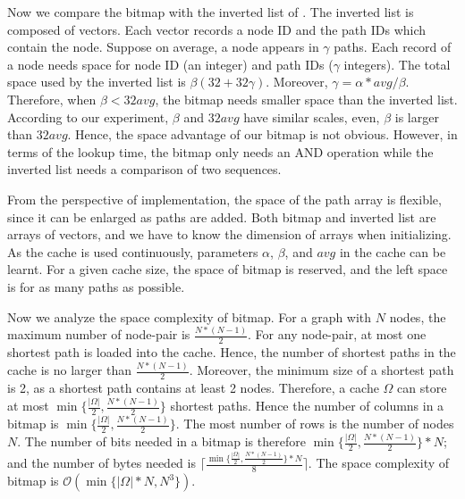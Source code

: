 Now we compare the bitmap with the inverted list of \cite{thomsen2012effective}. The inverted list is composed of vectors. Each vector records a node ID and the path IDs which contain the node.
Suppose on average, a node appears in $\gamma$ paths. Each record of a node needs space for node ID (an integer) and path IDs ($\gamma$ integers). The total space used by the inverted list is $\beta(32+32\gamma)$. Moreover, $\gamma=\alpha*\textit{avg}/\beta$. Therefore, when $\beta<32 \textit{avg}$, the bitmap needs smaller space than the inverted list. According to our experiment, $\beta$ and $32\textit{avg}$ have similar scales, even, $\beta$ is larger than $32\textit{avg}$. Hence, the space advantage of our bitmap is not obvious.
However, in terms of the lookup time, the bitmap only needs an AND operation while the inverted list needs a comparison of two sequences.

From the perspective of implementation, the space of the path array is flexible, since it can be enlarged as paths are added.
Both bitmap and inverted list are arrays of vectors, and we have to know the dimension of arrays when initializing. As the cache is used continuously, parameters $\alpha$, $\beta$, and $\textit{avg}$ in the cache can be learnt. For a given cache size, the space of bitmap is reserved, and the left space is for as many paths as possible.


Now we analyze the space complexity of bitmap. For a graph with $N$ nodes, the maximum number of node-pair is $\frac{N*(N-1)}{2}$.
For any node-pair, at most one shortest path is loaded into the cache. Hence, the number of shortest paths in the cache is no larger than $\frac{N*(N-1)}{2}$. Moreover, the minimum size of a shortest path is 2, as a shortest path contains at least 2 nodes.
Therefore, a cache $\Omega$ can store at most $\min\{{\frac{|\Omega|}{2},\frac{N*(N-1)}{2}}\}$ shortest paths. Hence the number of columns in a bitmap is $\min\{{\frac{|\Omega|}{2},\frac{N*(N-1)}{2}}\}$. The most number of rows is the number of nodes $N$.
The number of bits needed in a bitmap is therefore $\min\{{\frac{|\Omega|}{2},\frac{N*(N-1)}{2}}\}*N$; and the number of bytes needed is $\lceil\frac{\min\{{\frac{|\Omega|}{2},\frac{N*(N-1)}{2}}\}*N}{8}\rceil$.
The space complexity of bitmap is $\mathcal O(\min\{{|\Omega|*N,N^3\}})$.


